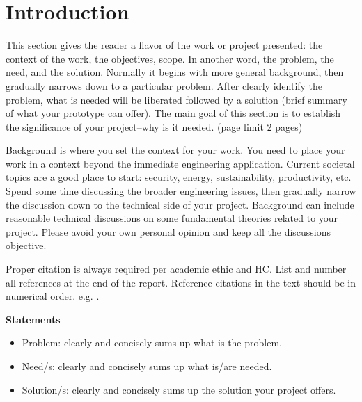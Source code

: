 \documentclass{engr1000j-s2}
\begin{document}
  \newpage
  \tableofcontents
  \thispagestyle{mystyle}
  \newpage

  \section{Introduction}
  This section gives the reader a flavor of the work or project presented: the
  context of the work, the objectives, scope. In another word, the problem, the need,
  and the solution. Normally it begins with more general background, then
  gradually narrows down to a particular problem. After clearly identify the problem,
  what is needed will be liberated followed by a solution (brief summary of what
  your prototype can offer). The main goal of this section is to establish the significance
  of your project--why is it needed. (page limit 2 pages)

  Background is where you set the context for your work. You need to place your work
  in a context beyond the immediate engineering application. Current societal
  topics are a good place to start: security, energy, sustainability,
  productivity, etc. Spend some time discussing the broader engineering issues, then
  gradually narrow the discussion down to the technical side of your project.
  Background can include reasonable technical discussions on some fundamental
  theories related to your project. Please avoid your own personal opinion and keep
  all the discussions objective.

  Proper citation is always required per academic ethic and HC. List and number
  all references at the end of the report. Reference citations in the text should
  be in numerical order. e.g. \citep{brandis2016nonequi}.

  \hspace{1em}

  \textbf{Statements}
  \begin{itemize}
    \item Problem: clearly and concisely sums up what is the problem.\\

    \item Need/s: clearly and concisely sums up what is/are needed.\\

    \item Solution/s: clearly and concisely sums up the solution your project
      offers.
  \end{itemize}
\end{document}
